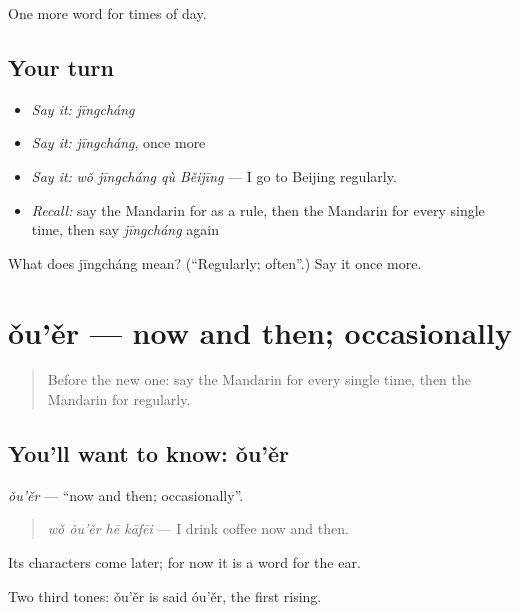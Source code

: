 \begin{grammarlens}[title={What you've built}]
One more word for times of day.
\end{grammarlens}

\subsection*{Your turn}
\begin{itemize}
\raggedright
  \item \emph{Say it:} \emph{jīngcháng}
  \item \emph{Say it:} \emph{jīngcháng}, once more
  \item \emph{Say it:} \emph{wǒ jīngcháng qù Běijīng} — I go to Beijing regularly.
  \item \emph{Recall:} say the Mandarin for as a rule, then the Mandarin for every single time, then say \emph{jīngcháng} again
\end{itemize}

\begin{tcolorbox}[breakable,colback=teal!4,colframe=teal!35!black,title={Before you move on}]
What does jīngcháng mean? (\textquotedblleft{}Regularly; often\textquotedblright{}.) Say it once more.
\end{tcolorbox}
\section[ǒu'ěr]{ǒu'ěr — now and then; occasionally}

\label{lesson:ZH-C162-ouer}



\begin{quote}
Before the new one: say the Mandarin for every single time, then the Mandarin for regularly.
\end{quote}

\subsection*{You'll want to know: ǒu'ěr}
\emph{ǒu'ěr} — \textquotedblleft{}now and then; occasionally\textquotedblright{}.

\begin{quote}
\emph{wǒ ǒu'ěr hē kāfēi} — I drink coffee now and then.
\end{quote}

Its characters come later; for now it is a word for the ear.

Two third tones: ǒu'ěr is said óu'ěr, the first rising.

